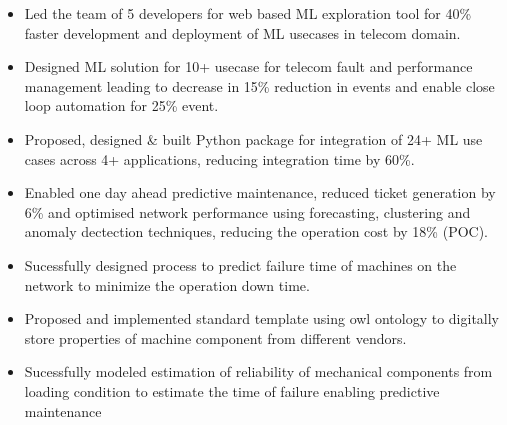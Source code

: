 \documentclass[10pt,a4paper,ragged2e,withhyper]{altacv}
\begin{document}
\begin{paracol}{2}
\begin{itemize}
\item Led the team of 5 developers for web based ML exploration tool for 40\% faster development and deployment of ML usecases in telecom domain.
\item Designed ML solution for 10+ usecase for telecom fault and performance management leading to decrease in 15\% reduction in events and enable close loop automation for 25\% event.
\end{itemize}


\begin{itemize}
\item Proposed, designed \& built Python package for integration of 24+ ML use cases across 4+ applications, reducing integration time by 60\%.
\end{itemize}

\begin{itemize}
\item Enabled one day ahead predictive maintenance, reduced ticket generation by 6\% and optimised network performance using forecasting, clustering  and anomaly dectection techniques, reducing the operation cost by 18\% (POC).
\end{itemize}

\switchcolumn
{}
\label{sec:org8c595d3}
\par\divider

\par\divider

\label{sec:org16a5d94}

\begin{itemize}
\item Sucessfully designed process to predict failure time of machines on the network to minimize the operation down time.
\item Proposed and implemented standard template using owl ontology to digitally store properties of machine component from different vendors.
\item Sucessfully modeled estimation of reliability of mechanical components from loading condition to estimate the time of failure enabling predictive maintenance
\end{itemize}


\end{paracol}
\end{document}
